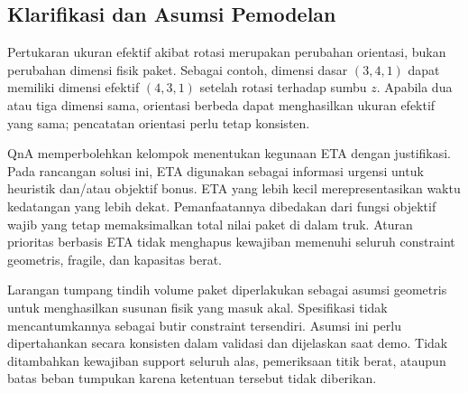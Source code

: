 \subsection{Klarifikasi dan Asumsi Pemodelan}
Pertukaran ukuran efektif akibat rotasi merupakan perubahan orientasi, bukan
perubahan dimensi fisik paket. Sebagai contoh, dimensi dasar $(3,4,1)$ dapat
memiliki dimensi efektif $(4,3,1)$ setelah rotasi terhadap sumbu $z$. Apabila
dua atau tiga dimensi sama, orientasi berbeda dapat menghasilkan ukuran
efektif yang sama; pencatatan orientasi perlu tetap konsisten.

QnA memperbolehkan kelompok menentukan kegunaan ETA dengan justifikasi.
Pada rancangan solusi ini, ETA digunakan sebagai informasi urgensi untuk
heuristik dan/atau objektif bonus. ETA yang lebih kecil merepresentasikan
waktu kedatangan yang lebih dekat. Pemanfaatannya dibedakan dari fungsi
objektif wajib yang tetap memaksimalkan total nilai paket di dalam truk.
Aturan prioritas berbasis ETA tidak menghapus kewajiban memenuhi seluruh
constraint geometris, fragile, dan kapasitas berat.


Larangan tumpang tindih volume paket diperlakukan sebagai asumsi geometris
untuk menghasilkan susunan fisik yang masuk akal. Spesifikasi tidak
mencantumkannya sebagai butir constraint tersendiri. Asumsi ini perlu
dipertahankan secara konsisten dalam validasi dan dijelaskan saat demo.
Tidak ditambahkan kewajiban support seluruh alas, pemeriksaan titik berat,
ataupun batas beban tumpukan karena ketentuan tersebut tidak diberikan.
